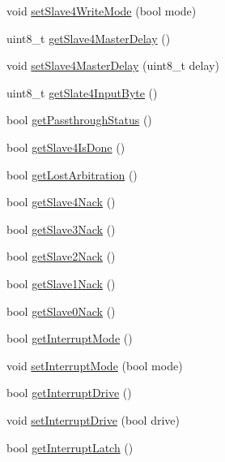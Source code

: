 \begin{DoxyCompactItemize}
\item 
void \mbox{\hyperlink{class_m_p_u6050_af1402fe7f3e1cc0dedb6714351cbca4e}{set\+Slave4\+Write\+Mode}} (bool mode)
\item 
uint8\+\_\+t \mbox{\hyperlink{class_m_p_u6050_a9a4585b3c9e61478db198011107a56a9}{get\+Slave4\+Master\+Delay}} ()
\item 
void \mbox{\hyperlink{class_m_p_u6050_ac154934a43c599cdc564fb29c22c45eb}{set\+Slave4\+Master\+Delay}} (uint8\+\_\+t delay)
\item 
uint8\+\_\+t \mbox{\hyperlink{class_m_p_u6050_a9bc93f34bc3d85cbe6010b4a3a88c5a7}{get\+Slate4\+Input\+Byte}} ()
\item 
bool \mbox{\hyperlink{class_m_p_u6050_af2820067b73f177d985ed81e894281b0}{get\+Passthrough\+Status}} ()
\item 
bool \mbox{\hyperlink{class_m_p_u6050_a105aefe645e7021f9ba4397e9df4114c}{get\+Slave4\+Is\+Done}} ()
\item 
bool \mbox{\hyperlink{class_m_p_u6050_acd775c72f85dabfc6f8fba43da096c6d}{get\+Lost\+Arbitration}} ()
\item 
bool \mbox{\hyperlink{class_m_p_u6050_ae9882b425cbdced4de325b608d896e10}{get\+Slave4\+Nack}} ()
\item 
bool \mbox{\hyperlink{class_m_p_u6050_a55f24d2f2b13d6e28a7c8b6bf2913520}{get\+Slave3\+Nack}} ()
\item 
bool \mbox{\hyperlink{class_m_p_u6050_af4b5101dab501d6df2e0cae909120771}{get\+Slave2\+Nack}} ()
\item 
bool \mbox{\hyperlink{class_m_p_u6050_a65cc9d75ff347b146414685fb83fa451}{get\+Slave1\+Nack}} ()
\item 
bool \mbox{\hyperlink{class_m_p_u6050_a74511edfcada3fb21c3327a0c846c72a}{get\+Slave0\+Nack}} ()
\item 
bool \mbox{\hyperlink{class_m_p_u6050_a58da1dfb39eb34e3a09a9b0bf4d87f29}{get\+Interrupt\+Mode}} ()
\item 
void \mbox{\hyperlink{class_m_p_u6050_a003a098a1521c5ef4df50c0a8a2d47ab}{set\+Interrupt\+Mode}} (bool mode)
\item 
bool \mbox{\hyperlink{class_m_p_u6050_af66e6c7b1885dcf452e73371790fddfd}{get\+Interrupt\+Drive}} ()
\item 
void \mbox{\hyperlink{class_m_p_u6050_a9d9d6aeea346e6f6fad8e4a428cf3301}{set\+Interrupt\+Drive}} (bool drive)
\item 
bool \mbox{\hyperlink{class_m_p_u6050_a5502c4c2a9bc4ea9267e128b7743923d}{get\+Interrupt\+Latch}} ()
\item 

\end{DoxyCompactItemize}
